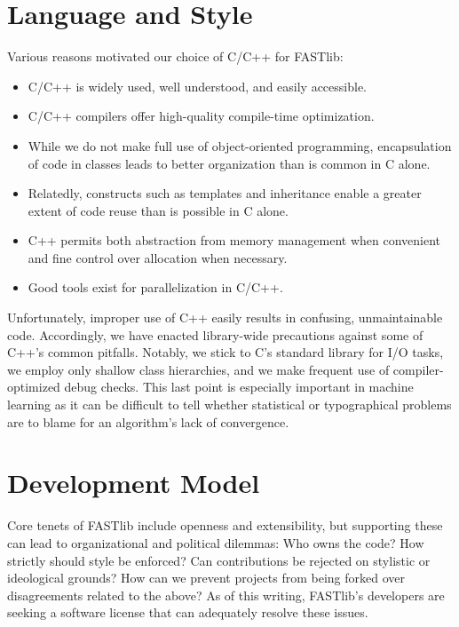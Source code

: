 \documentclass[letter]{report}
\begin{document}
\section {Language and Style}
Various reasons motivated our choice of C/C++ for FASTlib:
\begin{itemize}
\item C/C++ is widely used, well understood, and easily accessible.
\item C/C++ compilers offer high-quality compile-time optimization.
\item While we do not make full use of object-oriented programming,
  encapsulation of code in classes leads to better organization than
  is common in C alone.
\item Relatedly, constructs such as templates and inheritance enable a
  greater extent of code reuse than is possible in C alone.
\item C++ permits both abstraction from memory management when
  convenient and fine control over allocation when necessary.
\item Good tools exist for parallelization in C/C++.
\end{itemize}
Unfortunately, improper use of C++ easily results in confusing,
unmaintainable code.  Accordingly, we have enacted library-wide
precautions against some of C++'s common pitfalls.  Notably, we stick
to C's standard library for I/O tasks, we employ only shallow class
hierarchies, and we make frequent use of compiler-optimized debug
checks.  This last point is especially important in machine learning
as it can be difficult to tell whether statistical or typographical
problems are to blame for an algorithm's lack of convergence.

\section{Development Model}
Core tenets of FASTlib include openness and extensibility, but
supporting these can lead to organizational and political dilemmas:
Who owns the code?  How strictly should style be enforced?  Can
contributions be rejected on stylistic or ideological grounds?  How
can we prevent projects from being forked over disagreements related
to the above?  As of this writing, FASTlib's developers are seeking a
software license that can adequately resolve these issues.
\end{document}
